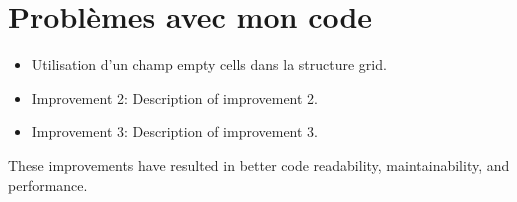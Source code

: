 \documentclass{article}
\begin{document}
\section{Problèmes avec mon code}

\begin{itemize}
  \item Utilisation d'un champ empty cells dans la structure grid.
  \item Improvement 2: Description of improvement 2.
  \item Improvement 3: Description of improvement 3.
\end{itemize}


These improvements have resulted in better code readability, maintainability, and performance.
\end{document}
